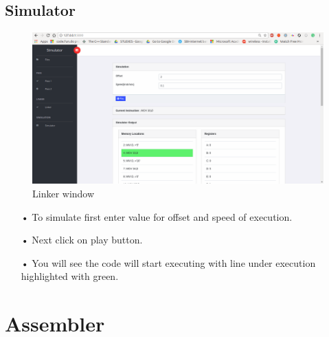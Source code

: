 \documentclass{scrreprt}
\begin{document}
\section{Simulator}
\begin{figure}[H]
\centering
\includegraphics[width=\textwidth, keepaspectratio]{simulator.png}
\caption{Linker window}
\end{figure}

\begin{itemize}
\item[•] To simulate first enter value for offset and speed of execution.
\item[•] Next click on play button.
\item[•] You will see the code will start executing with line under execution highlighted with green.
\end{itemize}

\chapter{Assembler}
\end{document}
